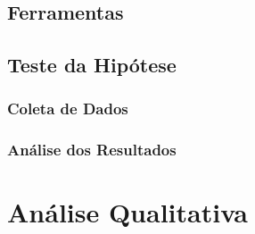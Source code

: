\subsection{Ferramentas} \label{subsec:ferramentas}

\subsection{Teste da Hipótese} \label{subsec:teste_hipotese}
\subsubsection{Coleta de Dados}
\subsubsection{Análise dos Resultados}

\section{Análise Qualitativa}


